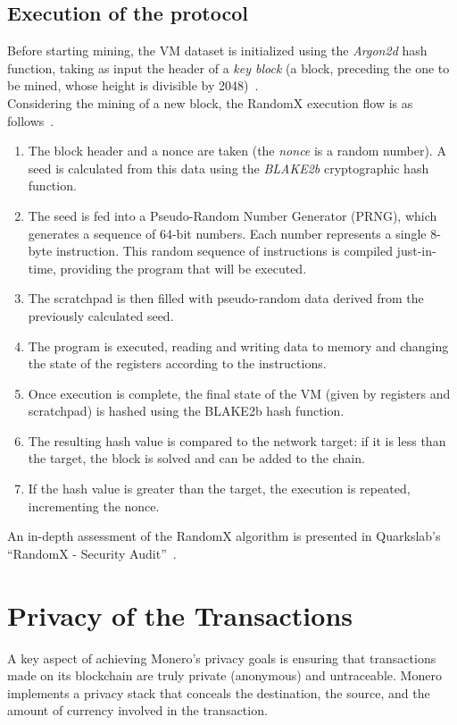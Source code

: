 \documentclass[conference]{IEEEtran}
\begin{document}
\subsection{Execution of the protocol}
Before starting mining, the VM dataset is initialized using the \textit{Argon2d} hash function, taking as input the header of a \textit{key block} (a block, preceding the one to be mined, whose height is divisible by 2048)~\cite{randomx_github}.\\
Considering the mining of a new block, the RandomX execution flow is as follows~\cite{randomx_design}.
\begin{enumerate}
    \item The block header and a nonce are taken (the \textit{nonce} is a random number). A seed is calculated from this data using the \textit{BLAKE2b} cryptographic hash function.
    \item The seed is fed into a Pseudo-Random Number Generator (PRNG), which generates a sequence of 64-bit numbers. Each number represents a single 8-byte instruction. This random sequence of instructions is compiled just-in-time, providing the program that will be executed.
    \item The scratchpad is then filled with pseudo-random data derived from the previously calculated seed.
    \item The program is executed, reading and writing data to memory and changing the state of the registers according to the instructions.
    \item Once execution is complete, the final state of the VM (given by registers and scratchpad) is hashed using the BLAKE2b hash function.
    \item The resulting hash value is compared to the network target: if it is less than the target, the block is solved and can be added to the chain.
    \item If the hash value is greater than the target, the execution is repeated, incrementing the nonce.
\end{enumerate}
An in-depth assessment of the RandomX algorithm is presented in Quarkslab’s ``RandomX - Security Audit''~\cite{randomx_quarkslab}.



\section{Privacy of the Transactions}\label{sec:transactions}
A key aspect of achieving Monero's privacy goals is ensuring that transactions made on its blockchain are truly private (anonymous) and untraceable. Monero implements a privacy stack that conceals the destination, the source, and the amount of currency involved in the transaction.
\end{document}
